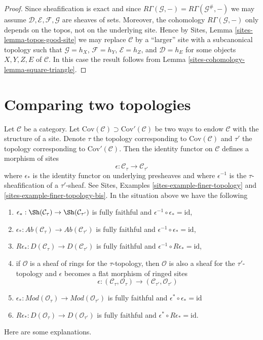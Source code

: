 \begin{proof}
Since sheafification is exact and since
$R\Gamma(\mathcal{G}, -) = R\Gamma(\mathcal{G}^\#, -)$
we may assume $\mathcal{D}, \mathcal{E}, \mathcal{F}, \mathcal{G}$
are sheaves of sets. Moreover, the cohomology
$R\Gamma(\mathcal{G}, -)$ only depends on the topos,
not on the underlying site. Hence by
Sites, Lemma \ref{sites-lemma-topos-good-site}
we may replace $\mathcal{C}$ by a ``larger'' site
with a subcanonical topology such that $\mathcal{G} = h_X$,
$\mathcal{F} = h_Y$,
$\mathcal{E} = h_Z$, and
$\mathcal{D} = h_E$
for some objects $X, Y, Z, E$ of $\mathcal{C}$.
In this case the result follows from
Lemma \ref{sites-cohomology-lemma-square-triangle}.
\end{proof}

\section{Comparing two topologies}
\label{sites-cohomology-section-compare}
Let $\mathcal{C}$ be a category. Let
$\text{Cov}(\mathcal{C}) \supset \text{Cov}'(\mathcal{C})$
be two ways to endow $\mathcal{C}$ with the structure of a site.
Denote $\tau$ the topology corresponding to $\text{Cov}(\mathcal{C})$
and $\tau'$ the topology corresponding to $\text{Cov}'(\mathcal{C})$.
Then the identity functor on $\mathcal{C}$ defines a morphism
of sites
$$
\epsilon : \mathcal{C}_\tau \longrightarrow \mathcal{C}_{\tau'}
$$
where $\epsilon_*$ is the identity functor on underlying presheaves and
where $\epsilon^{-1}$ is the $\tau$-sheafification of a $\tau'$-sheaf.
See Sites, Examples \ref{sites-example-finer-topology} and
\ref{sites-example-finer-topology-bis}.
In the situation above we have the following
\begin{enumerate}
\item $\epsilon_* : \Sh(\mathcal{C}_\tau) \to \Sh(\mathcal{C}_{\tau'})$
is fully faithful and $\epsilon^{-1} \circ \epsilon_* = \text{id}$,
\item $\epsilon_* : \textit{Ab}(\mathcal{C}_\tau) \to
\textit{Ab}(\mathcal{C}_{\tau'})$
is fully faithful and $\epsilon^{-1} \circ \epsilon_* = \text{id}$,
\item $R\epsilon_* : D(\mathcal{C}_\tau) \to D(\mathcal{C}_{\tau'})$
is fully faithful and $\epsilon^{-1} \circ R\epsilon_* = \text{id}$,
\item if $\mathcal{O}$ is a sheaf of rings for the $\tau$-topology,
then $\mathcal{O}$ is also a sheaf for the $\tau'$-topology
and $\epsilon$ becomes a flat morphism of ringed sites
$$
\epsilon :
(\mathcal{C}_\tau, \mathcal{O}_\tau)
\longrightarrow
(\mathcal{C}_{\tau'}, \mathcal{O}_{\tau'})
$$
\item $\epsilon_* : \textit{Mod}(\mathcal{O}_\tau) \to
\textit{Mod}(\mathcal{O}_{\tau'})$ is
fully faithful and $\epsilon^* \circ \epsilon_* = \text{id}$
\item $R\epsilon_* : D(\mathcal{O}_\tau) \to D(\mathcal{O}_{\tau'})$
is fully faithful and $\epsilon^* \circ R\epsilon_* = \text{id}$.
\end{enumerate}
Here are some explanations.

